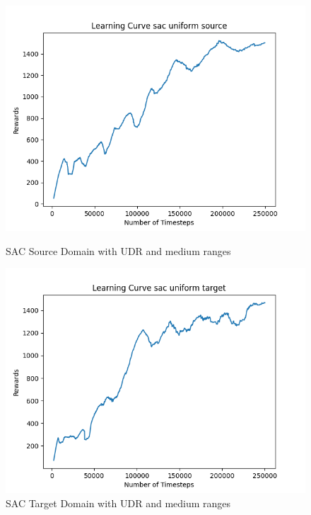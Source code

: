 \documentclass[11pt]{article}
\begin{document}
\begin{figure}[H]
    \centering
    \begin{minipage}{0.45\textwidth}
        \centering
        \includegraphics[width=\textwidth]{../images/Learning_Curve_SAC_Uniform_Medium_Source.png}
        \caption{SAC Source Domain with UDR and medium ranges}
        \label{fig:sac_source_udr_medium}
    \end{minipage}
    \hfill
    \begin{minipage}{0.45\textwidth}
        \centering
        \includegraphics[width=\textwidth]{../images/Learning_Curve_SAC_Uniform_Medium_Target.png}
        \caption{SAC Target Domain with UDR and medium ranges}
        \label{fig:sac_target_udr_medium}

\end{minipage}
\end{figure}
\end{document}
